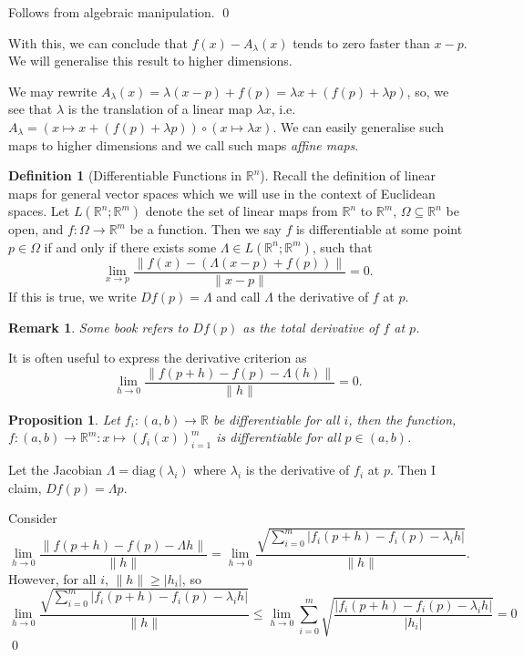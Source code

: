 \documentclass[
]{article}
\newtheorem{prop}{Proposition}
\newtheorem*{remark}{Remark}
\theoremstyle{definition}
\newtheorem{definition}{Definition}[section]
\begin{document}
Follows from algebraic manipulation. \qed

With this, we can conclude that \(f(x) - A_\lambda(x)\) tends to zero
faster than \(x - p\). We will generalise this result to higher
dimensions.

We may rewrite
\(A_\lambda(x) = \lambda(x - p) + f(p) = \lambda x + (f(p) + \lambda p)\),
so, we see that \(\lambda\) is the translation of a linear map
\(\lambda x\),
i.e.~\(A_\lambda = (x \mapsto x + (f(p) + \lambda p)) \circ (x \mapsto \lambda x)\).
We can easily generalise such maps to higher dimensions and we call such
maps \emph{affine maps}.

\begin{definition}[Differentiable Functions in \(\mathbb{R}^n\)]
  Recall the definition of linear maps for general vector spaces which we will 
  use in the context of Euclidean spaces. Let \(L(\mathbb{R}^n; \mathbb{R}^m)\) 
  denote the set of linear maps from \(\mathbb{R}^n\) to \(\mathbb{R}^m\), 
  \(\Omega \subseteq \mathbb{R}^n\) be open, and \(f : \Omega \to \mathbb{R}^m\) 
  be a function. Then we say \(f\) is differentiable at some point 
  \(p \in \Omega\) if and only if there exists some 
  \(\Lambda \in L(\mathbb{R}^n; \mathbb{R}^m)\), such that 
  \[ \lim_{x \to p} \frac{\| f(x) - (\Lambda(x - p) + f(p))\|}{\|x - p\|} = 0.
  \]
  If this is true, we write \(Df(p) = \Lambda\) and call \(\Lambda\) the 
  derivative of \(f\) at \(p\).
\end{definition}
\begin{remark}
  Some book refers to \(Df(p)\) as the total derivative of \(f\) at \(p\).
\end{remark}

It is often useful to express the derivative criterion as
\[\lim_{h \to 0} \frac{\|f(p + h) - f(p) - \Lambda(h)\|}{\| h \|} = 0.\]

\begin{prop}
  Let \(f_i : (a, b) \to \mathbb{R}\) be differentiable for all \(i\), then the 
  function, \(f : (a, b) \to \mathbb{R}^m : x \mapsto (f_i(x))_{i = 1}^m\) is 
  differentiable for all \(p \in (a, b)\).
\end{prop}
\proof

Let the Jacobian \(\Lambda = \text{diag}(\lambda_i)\) where
\(\lambda_i\) is the derivative of \(f_i\) at \(p\). Then I claim,
\(Df(p) = \Lambda p\).

Consider
\[\lim_{h \to 0} \frac{\|f(p + h) - f(p) - \Lambda h\|}{\| h \|} = 
  \lim_{h \to 0} \frac{\sqrt{\sum_{i = 0}^m \left|f_i(p + h) - f_i(p) - \lambda_i h\right|}}
  {\| h \|}.\] However, for all \(i\),
\(\| h \| \ge \left| h_i \right|\), so \[ \lim_{h \to 0}
  \frac{\sqrt{\sum_{i = 0}^m \left|f_i(p + h) - f_i(p) - \lambda_i h\right|}}
  {\| h \|} \le \lim_{h \to 0} \sum_{i = 0}^m
  \sqrt{\frac{\left|f_i(p + h) - f_i(p) - \lambda_i h\right|}
  {\left| h_i \right|}} = 0\] \qed
\end{document}
